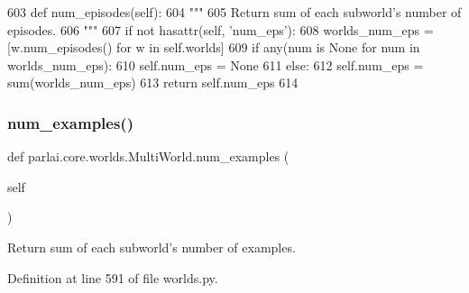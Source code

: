 \begin{DoxyCode}
603     \textcolor{keyword}{def }num\_episodes(self):
604         \textcolor{stringliteral}{"""}
605 \textcolor{stringliteral}{        Return sum of each subworld's number of episodes.}
606 \textcolor{stringliteral}{        """}
607         \textcolor{keywordflow}{if} \textcolor{keywordflow}{not} hasattr(self, \textcolor{stringliteral}{'num\_eps'}):
608             worlds\_num\_eps = [w.num\_episodes() \textcolor{keywordflow}{for} w \textcolor{keywordflow}{in} self.worlds]
609             \textcolor{keywordflow}{if} any(num \textcolor{keywordflow}{is} \textcolor{keywordtype}{None} \textcolor{keywordflow}{for} num \textcolor{keywordflow}{in} worlds\_num\_eps):
610                 self.num\_eps = \textcolor{keywordtype}{None}
611             \textcolor{keywordflow}{else}:
612                 self.num\_eps = sum(worlds\_num\_eps)
613         \textcolor{keywordflow}{return} self.num\_eps
614 
\end{DoxyCode}
\mbox{\label{classparlai_1_1core_1_1worlds_1_1MultiWorld_ae62ad8500e4208ed99ffcf91707746e1}} 
\subsubsection{\texorpdfstring{num\+\_\+examples()}{num\_examples()}}
{\footnotesize\ttfamily def parlai.\+core.\+worlds.\+Multi\+World.\+num\+\_\+examples (\begin{DoxyParamCaption}\item[{}]{self }\end{DoxyParamCaption})}

\begin{DoxyVerb}Return sum of each subworld's number of examples.
\end{DoxyVerb}
 

Definition at line 591 of file worlds.\+py.


